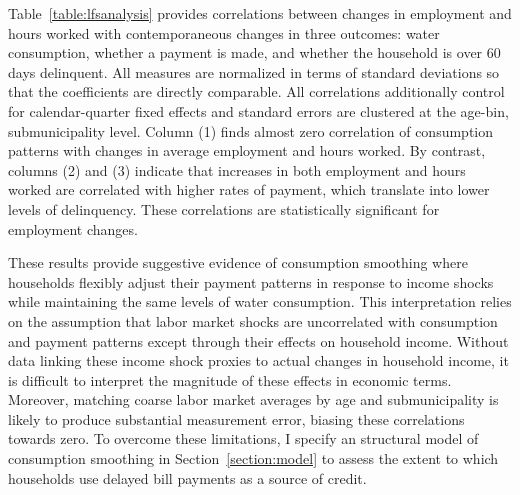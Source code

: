 \documentclass[12pt]{article}
\begin{document}
Table~\ref{table:lfsanalysis} provides correlations between changes in employment and hours worked with contemporaneous changes in three outcomes: water consumption, whether a payment is made, and whether the household is over 60 days delinquent.  All measures are normalized in terms of standard deviations so that the coefficients are directly comparable.  All correlations additionally control for calendar-quarter fixed effects and standard errors are clustered at the age-bin, submunicipality level.  Column (1) finds almost zero correlation of consumption patterns with changes in average employment and hours worked.  By contrast, columns (2) and (3) indicate that increases in both employment and hours worked are correlated with higher rates of payment, which translate into lower levels of delinquency.  These correlations are statistically significant for employment changes.  

These results provide suggestive evidence of consumption smoothing where households flexibly adjust their payment patterns in response to income shocks while maintaining the same levels of water consumption.  This interpretation relies on the assumption that labor market shocks are uncorrelated with consumption and payment patterns except through their effects on household income.  Without data linking these income shock proxies to actual changes in household income, it is difficult to interpret the magnitude of these effects in economic terms.  Moreover, matching coarse labor market averages by age and submunicipality is likely to produce substantial measurement error, biasing these correlations towards zero.  To overcome these limitations, I specify an structural model of consumption smoothing in Section~\ref{section:model} to assess the extent to which households use delayed bill payments as a source of credit.






\end{document}
